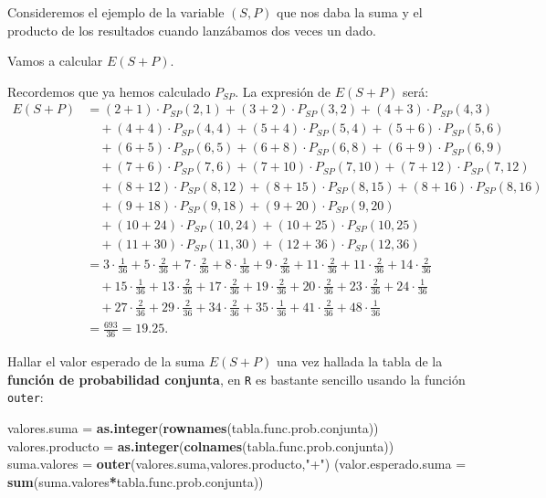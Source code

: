 \documentclass[]{book}
\newenvironment{Shaded}{\begin{snugshade}}{\end{snugshade}}
\newcommand{\DataTypeTok}[1]{\textcolor[rgb]{0.13,0.29,0.53}{#1}}
\newcommand{\KeywordTok}[1]{\textcolor[rgb]{0.13,0.29,0.53}{\textbf{#1}}}
\newcommand{\NormalTok}[1]{#1}
\newcommand{\OperatorTok}[1]{\textcolor[rgb]{0.81,0.36,0.00}{\textbf{#1}}}
\newcommand{\StringTok}[1]{\textcolor[rgb]{0.31,0.60,0.02}{#1}}
\begin{document}
Consideremos el ejemplo de la variable \((S,P)\) que nos daba la suma y el producto de los resultados cuando lanzábamos dos veces un dado.

Vamos a calcular \(E(S+P)\).

Recordemos que ya hemos calculado \(P_{SP}\). La expresión de \(E(S+P)\) será:
\[
\begin{array}{rl}
E(S+P) & = (2+1)\cdot P_{SP}(2,1)+(3+2)\cdot P_{SP}(3,2)+(4+3)\cdot P_{SP}(4,3)  \\ &
\quad +(4+4)\cdot P_{SP}(4,4) + (5+4)\cdot P_{SP}(5,4)+(5+6)\cdot P_{SP}(5,6)\\ & 
\quad +(6+5)\cdot P_{SP}(6,5)+(6+8)\cdot P_{SP}(6,8)+ (6+9)\cdot P_{SP}(6,9) \\ &
\quad + (7+6)\cdot P_{SP}(7,6)+(7+10)\cdot P_{SP}(7,10)+(7+12)\cdot P_{SP}(7,12)\\ & 
\quad + (8+12)\cdot P_{SP}(8,12)+(8+15)\cdot P_{SP}(8,15)+(8+16)\cdot P_{SP}(8,16)\\ & 
\quad +(9+18)\cdot P_{SP}(9,18)+ (9+20)\cdot P_{SP}(9,20)\\ & 
\quad +(10+24)\cdot P_{SP}(10,24) +(10+25)\cdot P_{SP}(10,25)\\ &
\quad +(11+30)\cdot P_{SP}(11,30)  + (12+36)\cdot P_{SP}(12,36) \\ & 
=  3\cdot \frac{1}{36}+5\cdot\frac{2}{36}+7\cdot \frac{2}{36}+8\cdot \frac{1}{36}+9\cdot \frac{2}{36}+11\cdot\frac{2}{36}+11\cdot \frac{2}{36}+14\cdot\frac{2}{36}
\\ &  \quad  +15\cdot\frac{1}{36} + 13\cdot\frac{2}{36}+17\cdot\frac{2}{36}+19\cdot\frac{2}{36}+20\cdot\frac{2}{36}+23\cdot\frac{2}{36}+24\cdot\frac{1}{36}
\\ & \quad+27\cdot\frac{2}{36}+29\cdot\frac{2}{36} + 34\cdot\frac{2}{36}+35\cdot\frac{1}{36}+41\cdot\frac{2}{36}+48\cdot\frac{1}{36}\\
& =\frac{693}{36}= 19.25.
\end{array}
\]

Hallar el valor esperado de la suma \(E(S+P)\) una vez hallada la tabla de la \textbf{función de probabilidad conjunta}, en \texttt{R} es bastante sencillo usando la función \texttt{outer}:

\begin{Shaded}
\begin{Highlighting}[]
\NormalTok{valores.suma =}\StringTok{ }\KeywordTok{as.integer}\NormalTok{(}\KeywordTok{rownames}\NormalTok{(tabla.func.prob.conjunta))}
\NormalTok{valores.producto =}\StringTok{ }\KeywordTok{as.integer}\NormalTok{(}\KeywordTok{colnames}\NormalTok{(tabla.func.prob.conjunta))}
\NormalTok{suma.valores =}\StringTok{ }\KeywordTok{outer}\NormalTok{(valores.suma,valores.producto,}\StringTok{"+"}\NormalTok{)}
\NormalTok{(}\DataTypeTok{valor.esperado.suma =} \KeywordTok{sum}\NormalTok{(suma.valores}\OperatorTok{*}\NormalTok{tabla.func.prob.conjunta))}
\end{Highlighting}
\end{Shaded}
\end{document}

